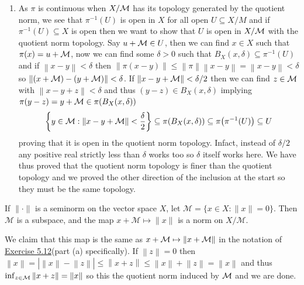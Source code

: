 \documentclass[12pt,a4paper]{article}
\begin{document}
\begin{solution}
\begin{enumerate}[label=\alph*.]
            By part (c), we have that $\pi\in L(X,X/\mM)$ and thus 
            \[
                \sum_{j=1}^n(x_j+\mM)=\pi\qty(\sum_{j=1}^n(x_j+y_j))\to\pi \qty( \sum_{j=1}^{\infty}(x_j+y_j))
            \]
            proving convergence, and thus by Theorem 5.1 we are done. 
        \item As $\pi$ is continuous when $X/\mathcal{M}$ has its topology generated by the quotient norm, we see that $\pi^{-1}(U)$ is open in $X$ for all open $U \subseteq X/M$ and if $\pi^{-1}(U) \subseteq X$ is open then we want to show that $U$ is open in $X/\mathcal{M}$ with the quotient norm topology.  
            Say $u+\mathcal{M}\in U$, then we can find $x\in X$ such that $\pi(x)=u+\mathcal{M}$, now we can find some $\delta>0$ such that $B_X(x,\delta) \subseteq\pi^{-1}(U)$ and if $ \left\|x-y\right\|<\delta$ then $ \left\|\pi(x-y)\right\|\leq \left\|\pi\right\| \left\|x-y\right\|= \left\|x-y\right\|<\delta$ so $ \left\|(x+\mathcal{M})-(y+\mathcal{M})\right\|<\delta$. 
            If $ \left\|x-y+\mathcal{M}\right\|<\delta/2$ then we can find $z\in\mathcal{M}$ with $ \left\|x-y+z\right\|<\delta$ and thus $(y-z)\in B_X(x,\delta)$ implying $\pi(y-z)=y+\mathcal{M}\in\pi(B_X(x,\delta))$
            \[
                \qty{y\in\mathcal{M}: \left\|x-y+\mathcal{M}\right\|< \frac{\delta}{2}} \subseteq \pi \qty( B_X(x,\delta)) \subseteq\pi \qty(\pi^{-1}(U)) \subseteq U
            \]
            proving that it is open in the quotient norm topology. 
            Infact, instead of $\delta/2$ any positive real strictly less than $\delta$ works too so $\delta$ itself works here. 
            We have thus proved that the quotient norm topology is finer than the quotient topology and we proved the other direction of the inclusion at the start so they must be the same topology. 
    \end{enumerate}
\end{solution}
\begin{problem}\label{prob:5-13}
If $\|\cdot\|$ is a seminorm on the vector space $X$, let $\mathcal{M} = \{x \in X : \|x\| = 0\}$. Then $\mathcal{M}$ is a subspace, and the map $x+\mathcal{M} \mapsto \|x\|$ is a norm on $X/\mathcal{M}$.
\end{problem}
\begin{solution}
    We claim that this map is the same as $x+\mathcal{M}\mapsto\left\|x+\mathcal{M}\right\|$ in the notation of \hyperref[prob:5-12]{Exercise 5.12}(part (a) specifically). 
    If $\left\|z\right\|=0$ then $\left\|x\right\|=| \left\|x\right\|- \left\|z\right\||\leq\left\|x+z\right\|\leq \left\|x\right\|+ \left\|z\right\|= \left\|x\right\|$ and thus $\inf_{z\in\mathcal{M}} \left\|x+z\right\|= \left\|x\right\|$ so this the quotient norm induced by $\mathcal{M}$ and we are done. 
\end{solution}
\end{document}
